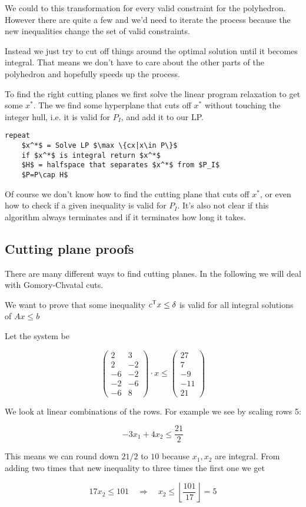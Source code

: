 We could to this transformation for every valid constraint for the polyhedron. However there are quite a few and we'd need to iterate the process because the new inequalities change the set of valid constraints.

Instead we just try to cut off things around the optimal solution until it becomes integral. That means we don't have to care about the other parts of the polyhedron and hopefully speeds up the process.

To find the right cutting planes we first solve the linear program relaxation to get some $x^*$. The we find some hyperplane that cuts off $x^*$ without touching the integer hull, i.e. it is valid for $P_I$, and add it to our LP.

\begin{lstlisting}
repeat
	$x^*$ = Solve LP $\max \{cx|x\in P\}$
	if $x^*$ is integral return $x^*$
	$H$ = halfspace that separates $x^*$ from $P_I$
	$P=P\cap H$
\end{lstlisting}

Of course we don't know how to find the cutting plane that cuts off $x^*$, or even how to check if a given inequality is valid for $P_I$. It's also not clear if this algorithm always terminates and if it terminates how long it takes.

\subsection{Cutting plane proofs}

There are many different ways to find cutting planes. In the following we will deal with Gomory-Chvatal cuts.

We want to prove that some inequality ${c}^\text{\upshape \sffamily T}x\leq \delta$ is valid for all integral solutions of $Ax\leq b$

\begin{Ex}
Let the system be

\[\begin{pmatrix}
2 & 3\\
2 & -2 \\
-6 & -2\\
-2 & -6\\
-6 & 8
\end{pmatrix}\cdot x \leq \begin{pmatrix} 27\\7\\-9\\-11\\21\end{pmatrix}\]

We look at linear combinations of the rows. For example we see by scaling rows 5:

\[-3x_1+4x_2 \leq \frac{21}{2}\]

This means we can round down $21/2$ to $10$ because $x_1,x_2$ are integral. From adding two times that new inequality to three times the first one we get

\[17x_2 \leq 101 \quad \Rightarrow \quad x_2 \leq \left\lfloor \frac{101}{17}\right\rfloor = 5\]
\end{Ex}

